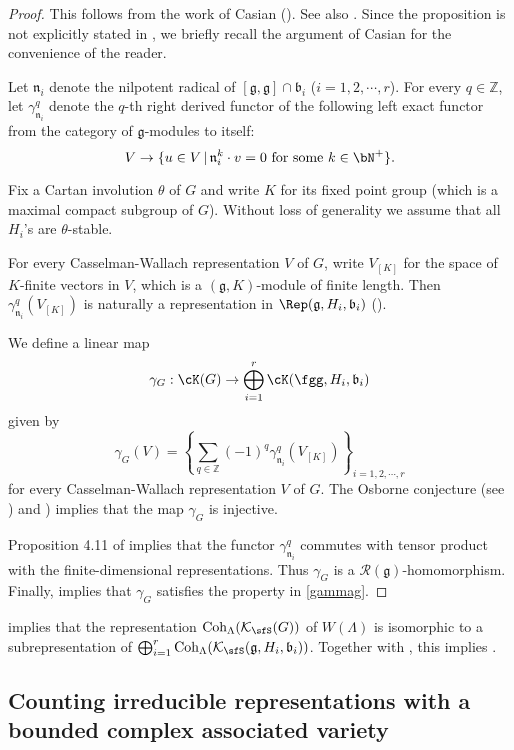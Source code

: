 \documentclass[12pt,a4paper]{amsart}
\newcommand{\CK}{{\mathcal {K}}}
\newcommand{\g}{\mathfrak g}
\renewcommand{\b}{\mathfrak b}
\newcommand{\n}{\mathfrak n}
\newcommand{\Z}{\mathbb{Z}}
\numberwithin{equation}{section}
\theoremstyle{remark}
\def\Coh{\mathrm{Coh}}
\newcommand{\Grt}{\cK}
\begin{document}
\begin{proof}
This follows from the work of Casian (\cite{Cas}). See also {\cite{Mc}}. Since the proposition is not explicitly stated in \cite{Cas}, we briefly recall the argument of Casian for the convenience of the reader.



 Let $\n_i$ denote the nilpotent radical of $[\g,\g]\cap \b_i$ ($i=1,2, \cdots,r$).
 For every $q\in \Z$, let $\gamma_{\n_i}^q$ denote the $q$-th right derived functor of the following left exact functor from the category of $\g$-modules to itself:
 \[
   V\rightarrow \{u\in V\,|\, \n_i^k \cdot v=0\textrm{ for some $k\in \bN^+$}\}.
 \]

Fix a Cartan involution $\theta$ of $G$ and write $K$ for its fixed point group (which is a maximal compact subgroup of $G$).  Without loss of generality we assume that all $H_i$'s are $\theta$-stable.

For every Casselman-Wallach representation $V$ of $G$, write $V_{[K]}$ for the space of $K$-finite vectors in $V$, which is a $(\g,K)$-module of finite length. Then   $\gamma_{\n_i}^q(V_{[K]})$ is naturally a representation in $\Rep(\g, H_i, \b_i)$ (\cite[Corollary 4.9]{Cas}).

We define a linear map
 \[
\gamma_{G}: \Grt(G)\rightarrow  \bigoplus_{i=1}^{r} \Grt(\fgg,H_{i},\b_{i})
 \]
 given by
 \[
   \gamma_{G}(V)= \left\{\sum_{q\in \Z} (-1)^{q} \gamma^{q}_{\n_i}(V_{[K]})\right\}_{i=1,2, \cdots, r}
 \]
for every Casselman-Wallach representation $V$ of $G$. The Osborne conjecture (see \cite[Theorem 3.1]{Cas}) and \cite[Corollary 4.9]{Cas}) implies that the map $\gamma_{G}$ is injective.

Proposition 4.11 of \cite{Cas} implies that the functor $\gamma_{\n_i}^q$ commutes with tensor product with the finite-dimensional representations. Thus $\gamma_{G}$ is a $\mathcal R(\g)$-homomorphism. Finally, \cite[Corollary 4.15]{Cas} implies that $\gamma_{G}$ satisfies the property in \eqref{gammag}.
\end{proof}




 implies that the representation $\Coh_{\Lambda}(\CK_\sfS(G))$ of $W(\Lambda)$ is isomorphic to a subrepresentation of
$\bigoplus_{i=1}^r \Coh_{\Lambda}(\CK_{\sfS}(\g,H_i,\b_i))$. Together with  , this implies .






\subsection{Counting irreducible representations with a bounded complex
  associated variety} %
\end{document}
